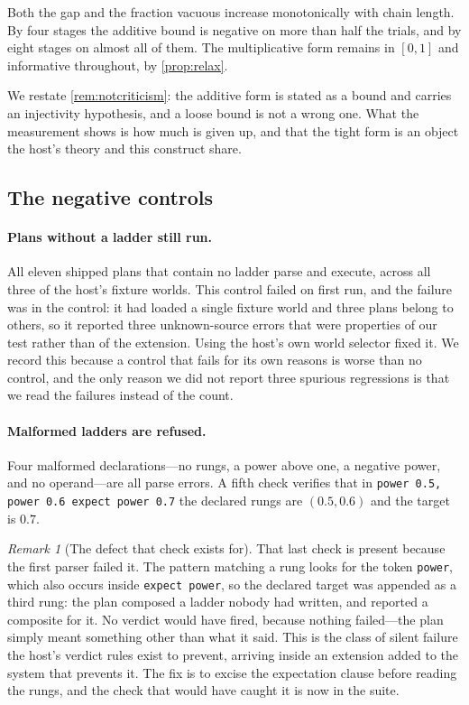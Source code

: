 \documentclass[11pt,twocolumn,a4paper]{article}
\theoremstyle{plain}
\theoremstyle{definition}
\theoremstyle{remark}
\newtheorem{remark}[theorem]{Remark}
\newcommand{\hfq}[1]{\texttt{#1}}
\begin{document}
Both the gap and the fraction vacuous increase monotonically with chain length.
By four stages the additive bound is negative on more than half the trials, and
by eight stages on almost all of them. The multiplicative form remains in
$[0,1]$ and informative throughout, by \cref{prop:relax}.

We restate \cref{rem:notcriticism}: the additive form is stated as a bound and
carries an injectivity hypothesis, and a loose bound is not a wrong one. What
the measurement shows is how much is given up, and that the tight form is an
object the host's theory and this construct share.

\subsection{The negative controls}

\paragraph{Plans without a ladder still run.} All eleven shipped plans that
contain no ladder parse and execute, across all three of the host's fixture
worlds. This control failed on first run, and the failure was in the control:
it had loaded a single fixture world and three plans belong to others, so it
reported three unknown-source errors that were properties of our test rather
than of the extension. Using the host's own world selector fixed it. We record
this because a control that fails for its own reasons is worse than no control,
and the only reason we did not report three spurious regressions is that we
read the failures instead of the count.

\paragraph{Malformed ladders are refused.} Four malformed declarations---no
rungs, a power above one, a negative power, and no operand---are all parse
errors. A fifth check verifies that in
\hfq{power 0.5, power 0.6 expect power 0.7} the declared rungs are
$(0.5,0.6)$ and the target is $0.7$.

\begin{remark}[The defect that check exists for]
\label{rem:defect}
That last check is present because the first parser failed it. The pattern
matching a rung looks for the token \hfq{power}, which also occurs inside
\hfq{expect power}, so the declared target was appended as a third rung: the
plan composed a ladder nobody had written, and reported a composite for it. No
verdict would have fired, because nothing failed---the plan simply meant
something other than what it said. This is the class of silent failure the
host's verdict rules exist to prevent, arriving inside an extension added to
the system that prevents it. The fix is to excise the expectation clause before
reading the rungs, and the check that would have caught it is now in the suite.
\end{remark}
\end{document}
